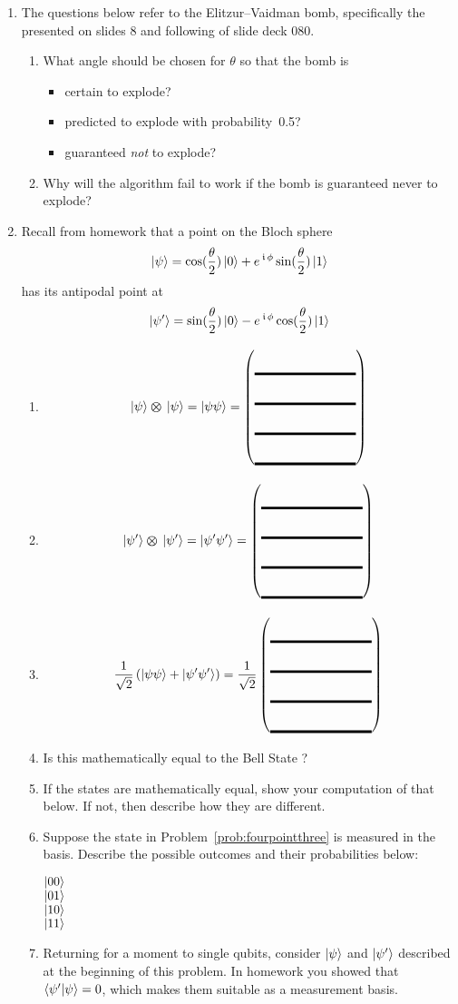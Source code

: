 \documentclass[12pt]{article}
\def\TwoQBlank{%
\DQB{\Blank[8em]}{\Blank[8em]}{\Blank[8em]}{\Blank[8em]}%
}
\begin{document}
\begin{enumerate}
\begin{enumerate}[label=\theenumi.\arabic*]
    \LeaveSpace[2in]{}
\end{enumerate}
\item The questions below refer to the Elitzur--Vaidman bomb, specifically the  presented on slides 8 and following of slide deck 080.
\begin{enumerate}[label=\theenumi.\arabic*]
  \item What angle should be chosen for $\theta$ so that the bomb is
  \begin{itemize}
      \item certain to explode?\Blank{}
      \item predicted to explode with probability~0.5?\Blank{}
  \item guaranteed \emph{not} to explode?\Blank{}
  \end{itemize}
  \item Why will the algorithm fail to work if the bomb is guaranteed never to explode?\LeaveSpace{}
\end{enumerate}

\item Recall from homework that a point on the Bloch sphere
\[
\ket{\psi} = \cos(\frac{\theta}{2})\ket{0}
    + e^{\,\kern 0.5pt\mathfrak{i}\,\phi}\sin(\frac{\theta}{2})\ket{1}
\]
has its antipodal point at
        \[
        \ket{\psi'}= \sin({\frac{\theta}{2})\ket{0}-e^{\,\kern 0.5pt\mathfrak{i}\,\phi}\cos({\frac{\theta}{2}})\ket{1}}
        \]
\begin{enumerate}[label=\theenumi.\arabic*]
\item \[
\TensProd{\ket{\psi}}{\ket{\psi}} = \ket{\psi\psi} = \TwoQBlank{}
\]
\item \[
\TensProd{\ket{\psi'}}{\ket{\psi'}} = \ket{\psi'\psi'} = \TwoQBlank{}
\]
\item\label{prob:fourpointthree}
\[
\TwoSup{\psi\psi}{\psi'\psi'} = \RootTwo{}\TwoQBlank{}
\]
\item Is this mathematically equal to the Bell State ? \Blank{}
\item If the states are mathematically equal, show your computation of that below.  If not, then describe how they are different.
\LeaveSpace{}
\item Suppose the state in Problem~\ref{prob:fourpointthree} is measured in the \TensProd{\PauliZ}{\PauliZ} basis.  Describe the possible outcomes and their probabilities below:
\begin{description}
    \item[$\ket{00}$] \Blank[3in]{}
    \item[$\ket{01}$] \Blank[3in]{}
    \item[$\ket{10}$] \Blank[3in]{}
    \item[$\ket{11}$] \Blank[3in]{}
\end{description}
\item\label{prob:matrix} Returning for a moment to single qubits, consider $\ket{\psi}$ and $\ket{\psi'}$ described at the beginning of this problem. In homework you showed that $\braket{\psi'|\psi}=0$, which makes them suitable as a measurement basis.


\end{enumerate}
\end{enumerate}
\end{document}
